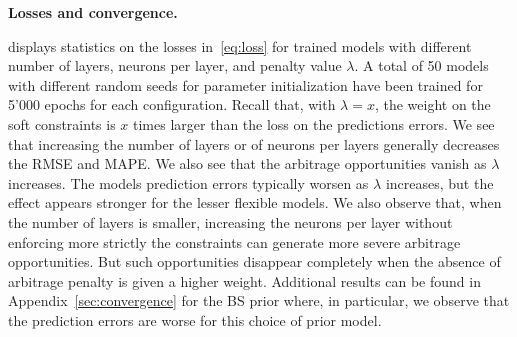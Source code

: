 
%  


\textbf{Losses and convergence.}

 displays statistics on the losses in~\eqref{eq:loss} for trained models with different number of layers, neurons per layer, and penalty value $\lambda$.
A total of 50 models with different random seeds for parameter initialization have been trained for 5'000 epochs for each configuration.
Recall that, with $\lambda=x$, the weight on the soft constraints is $x$ times larger than the loss on the predictions errors.
We see that increasing the number of layers or of neurons per layers generally decreases the RMSE and MAPE.
We also see that the arbitrage opportunities vanish as $\lambda$ increases.
The models prediction errors typically worsen as $\lambda$ increases, but the effect appears stronger for the lesser flexible models.
We also observe that, when the number of layers is smaller, increasing the neurons per layer without enforcing more strictly the constraints can generate more severe arbitrage opportunities.
But such opportunities disappear completely when the absence of arbitrage penalty is given a higher weight.
Additional results can be found in Appendix~\ref{sec:convergence} for the BS prior where,
in particular, we observe that the prediction errors are worse for this choice of prior model.

